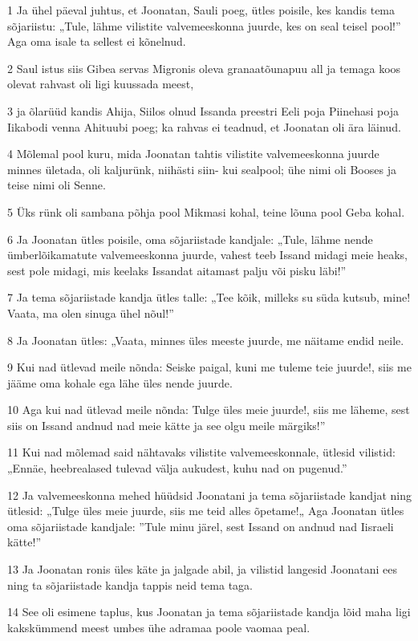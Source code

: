 \par 1 Ja ühel päeval juhtus, et Joonatan, Sauli poeg, ütles poisile, kes kandis tema sõjariistu: „Tule, lähme vilistite valvemeeskonna juurde, kes on seal teisel pool!” Aga oma isale ta sellest ei kõnelnud.
\par 2 Saul istus siis Gibea servas Migronis oleva granaatõunapuu all ja temaga koos olevat rahvast oli ligi kuussada meest,
\par 3 ja õlarüüd kandis Ahija, Siilos olnud Issanda preestri Eeli poja Piinehasi poja Iikabodi venna Ahituubi poeg; ka rahvas ei teadnud, et Joonatan oli ära läinud.
\par 4 Mõlemal pool kuru, mida Joonatan tahtis vilistite valvemeeskonna juurde minnes ületada, oli kaljurünk, niihästi siin- kui sealpool; ühe nimi oli Booses ja teise nimi oli Senne.
\par 5 Üks rünk oli sambana põhja pool Mikmasi kohal, teine lõuna pool Geba kohal.
\par 6 Ja Joonatan ütles poisile, oma sõjariistade kandjale: „Tule, lähme nende ümberlõikamatute valvemeeskonna juurde, vahest teeb Issand midagi meie heaks, sest pole midagi, mis keelaks Issandat aitamast palju või pisku läbi!”
\par 7 Ja tema sõjariistade kandja ütles talle: „Tee kõik, milleks su süda kutsub, mine! Vaata, ma olen sinuga ühel nõul!”
\par 8 Ja Joonatan ütles: „Vaata, minnes üles meeste juurde, me näitame endid neile.
\par 9 Kui nad ütlevad meile nõnda: Seiske paigal, kuni me tuleme teie juurde!, siis me jääme oma kohale ega lähe üles nende juurde.
\par 10 Aga kui nad ütlevad meile nõnda: Tulge üles meie juurde!, siis me läheme, sest siis on Issand andnud nad meie kätte ja see olgu meile märgiks!”
\par 11 Kui nad mõlemad said nähtavaks vilistite valvemeeskonnale, ütlesid vilistid: „Ennäe, heebrealased tulevad välja aukudest, kuhu nad on pugenud.”
\par 12 Ja valvemeeskonna mehed hüüdsid Joonatani ja tema sõjariistade kandjat ning ütlesid: „Tulge üles meie juurde, siis me teid alles õpetame!„ Aga Joonatan ütles oma sõjariistade kandjale: ”Tule minu järel, sest Issand on andnud nad Iisraeli kätte!”
\par 13 Ja Joonatan ronis üles käte ja jalgade abil, ja vilistid langesid Joonatani ees ning ta sõjariistade kandja tappis neid tema taga.
\par 14 See oli esimene taplus, kus Joonatan ja tema sõjariistade kandja lõid maha ligi kakskümmend meest umbes ühe adramaa poole vaomaa peal.
